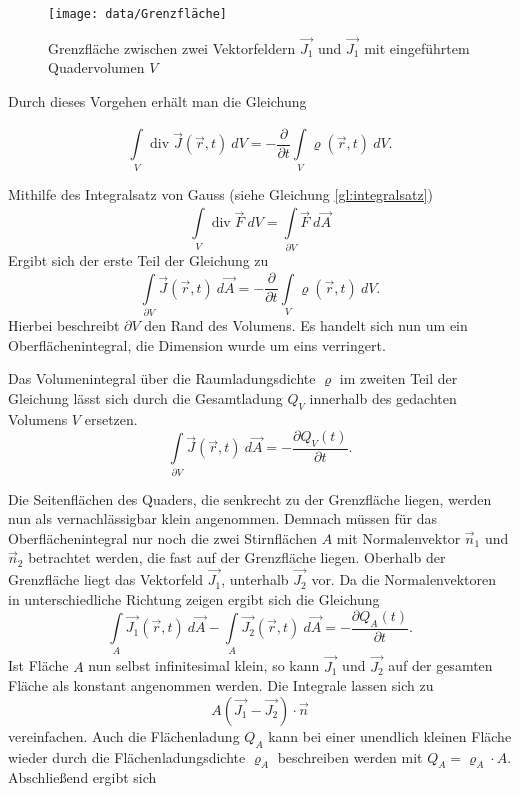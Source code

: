 \begin{figure}[thbp]
	\centering
	\texttt{[image: data/Grenzfläche]}
	\caption{Grenzfläche zwischen zwei Vektorfeldern $\vec{J_1}$ und $\vec{J_1}$ mit eingeführtem Quadervolumen $V$}
	\label{fig:grenz}
\end{figure}

Durch dieses Vorgehen erhält man die Gleichung

\begin{equation*}
\int\limits_{V}^{} \operatorname{div}\vec{J}(\vec{r},t) \ dV = -\frac{\partial}{\partial t} \int\limits_{V}^{} \varrho (\vec{r},t) \ dV.
\end{equation*}

Mithilfe des Integralsatz von Gauss (siehe Gleichung \ref{gl:integralsatz})
\begin{equation}
\label{gl:integralsatz}
\int\limits_{V}^{} \operatorname{div}\vec{F} \ dV = \int\limits_{\partial V}^{} \vec{F} \ d\vec{A}
\end{equation}
Ergibt sich der erste Teil der Gleichung zu 
\begin{equation*}
\int\limits_{\partial V}^{} \vec{J}(\vec{r},t) \ d\vec{A} = -\frac{\partial}{\partial t} \int\limits_{V}^{} \varrho (\vec{r},t) \ dV.
\end{equation*}
Hierbei beschreibt $\partial V$ den Rand des Volumens. Es handelt sich nun um ein Oberflächenintegral, die Dimension wurde um eins verringert.

Das Volumenintegral über die Raumladungsdichte $\varrho$ im zweiten Teil der Gleichung lässt sich durch die Gesamtladung $Q_V$ innerhalb des gedachten Volumens $V$ ersetzen.
\begin{equation*}
\int\limits_{\partial V}^{} \vec{J}(\vec{r},t) \ d\vec{A} = -\frac{\partial Q_V(t)}{\partial t}.
\end{equation*}

Die Seitenflächen des Quaders, die senkrecht zu der Grenzfläche liegen, werden nun als vernachlässigbar klein angenommen. Demnach müssen für das Oberflächenintegral nur noch die zwei Stirnflächen $A$ mit Normalenvektor $\vec{n}_1$ und $\vec{n}_2$ betrachtet werden, die fast auf der Grenzfläche liegen. Oberhalb der Grenzfläche liegt das Vektorfeld $\vec{J_1}$, unterhalb $\vec{J_2}$ vor. Da die Normalenvektoren in unterschiedliche Richtung zeigen ergibt sich die Gleichung
\begin{equation*}
\int\limits_{A}^{} \vec{J_1}(\vec{r},t) \ d\vec{A} - \int\limits_{A}^{} \vec{J_2}(\vec{r},t) \ d\vec{A} = -\frac{\partial Q_A(t)}{\partial t}.
\end{equation*}
Ist Fläche $A$ nun selbst infinitesimal klein, so kann $\vec{J_1}$ und $\vec{J_2}$ auf der gesamten Fläche als konstant angenommen werden. Die Integrale lassen sich zu 
\begin{equation*}
A(\vec{J_1}-\vec{J_2})\cdot \vec{n}
\end{equation*}
vereinfachen. Auch die Flächenladung $Q_A$ kann bei einer unendlich kleinen Fläche wieder durch die Flächenladungsdichte $\varrho_A$ beschreiben werden  mit $Q_A =\varrho_A \cdot A $. Abschließend ergibt sich

